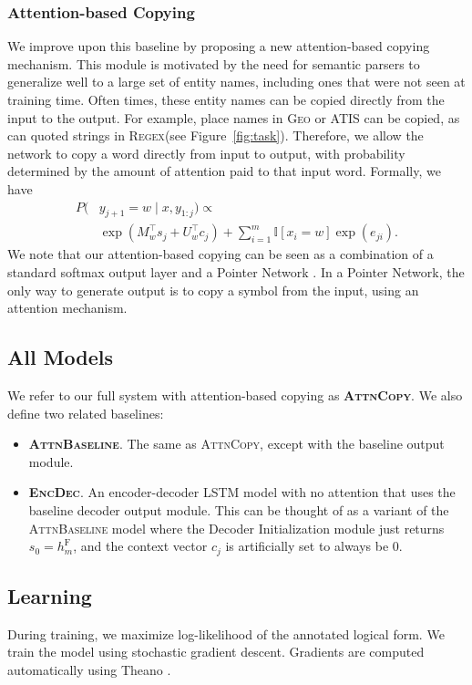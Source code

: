 \documentclass[11pt,letterpaper]{article}
\newcommand{\encdec}{\textsc{EncDec}\xspace}
\newcommand{\attn}{\textsc{AttnBaseline}\xspace}
\newcommand{\attncopy}{\textsc{AttnCopy}\xspace}
\newcommand{\atis}{\textsc{ATIS}\xspace}
\newcommand{\regex}{\textsc{Regex}\xspace}
\newcommand{\geo}{\textsc{Geo}\xspace}
\newcommand\rj[1]{}
\begin{document}
\subsubsection{Attention-based Copying}
We improve upon this baseline by proposing a new 
attention-based copying mechanism.
This module is motivated by the need for semantic parsers
to generalize well to a large set of entity names,
including ones that were not seen at training time.
Often times, these entity names
can be copied directly from the input to the output.
For example, place names in \geo or \atis can be copied,
as can quoted strings in \regex (see Figure~\ref{fig:task}).
Therefore, we allow the network to copy a word directly from input to output,
with probability determined by the amount of attention paid to that input word.
Formally, we have
\begin{align}
  P(&y_{j+1} = w \mid x, y_{1:j}) \propto 
  \\ & \exp(M_{w}^\top s_j + U_w^\top c_j)
  + \sum_{i=1}^m \mathbb{I}[x_i = w] \exp(e_{ji}).
\end{align}
We note that our attention-based copying can be seen as a 
combination of a standard softmax output layer
and a Pointer Network \cite{vinyals2015pointer}.  In a Pointer Network,
the only way to generate output is to copy a symbol from the input,
using an attention mechanism.

\subsection{All Models}
We refer to our full system with attention-based copying as \textbf{\attncopy}.
We also define two related baselines:
\begin{itemize}
  \item \textbf{\attn}.  The same as \attncopy, except with the baseline 
    output module.
  \item \textbf{\encdec}.  An encoder-decoder LSTM model with no attention
    that uses the baseline decoder output module.  
    This can be thought of as a variant of the \attn model
    where the Decoder Initialization module
    just returns $s_0 = h_m^{\text{F}}$,
    and the context vector $c_j$ is artificially set to always be $0$.
    \rj{I need to make sure this is true}
\end{itemize}

\subsection{Learning}
During training, we maximize log-likelihood of the annotated logical form.
We train the model using stochastic gradient descent.
Gradients are computed automatically using Theano \cite{bergstra2010theano}.
\end{document}
